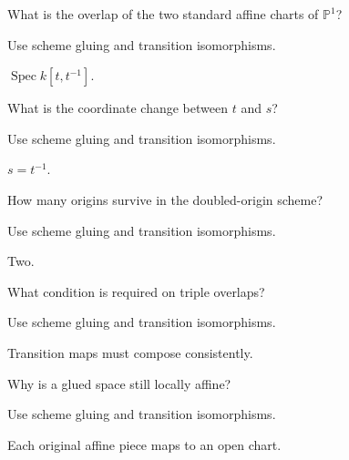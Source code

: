 \begin{exercise}\label{exr:vi20-expand-01}
What is the overlap of the two standard affine charts of $\mathbb P^1$?
\end{exercise}
\begin{hint}
Use scheme gluing and transition isomorphisms.
\end{hint}
\begin{solution}
$\operatorname{Spec}k[t,t^{-1}]$.
\end{solution}

\begin{exercise}[Transition]\label{exr:vi20-expand-02}
What is the coordinate change between $t$ and $s$?
\end{exercise}
\begin{hint}
Use scheme gluing and transition isomorphisms.
\end{hint}
\begin{solution}
$s=t^{-1}$.
\end{solution}

\begin{exercise}\label{exr:vi20-expand-03}
How many origins survive in the doubled-origin scheme?
\end{exercise}
\begin{hint}
Use scheme gluing and transition isomorphisms.
\end{hint}
\begin{solution}
Two.
\end{solution}

\begin{exercise}[Cocycle]\label{exr:vi20-expand-04}
What condition is required on triple overlaps?
\end{exercise}
\begin{hint}
Use scheme gluing and transition isomorphisms.
\end{hint}
\begin{solution}
Transition maps must compose consistently.
\end{solution}

\begin{exercise}\label{exr:vi20-expand-05}
Why is a glued space still locally affine?
\end{exercise}
\begin{hint}
Use scheme gluing and transition isomorphisms.
\end{hint}
\begin{solution}
Each original affine piece maps to an open chart.
\end{solution}

